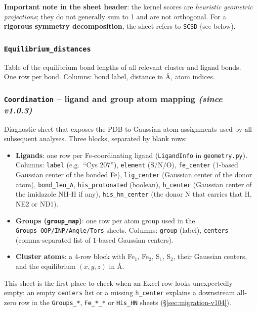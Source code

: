 \documentclass[11pt,a4paper,twoside]{article}
\providecommand{\angstrom}{\text{\AA}}    %
\theoremstyle{remark}
\begin{document}
\textbf{Important note in the sheet header}: the kernel scores
are \emph{heuristic geometric projections}; they do not generally
sum to 1 and are not orthogonal. For a \textbf{rigorous symmetry
decomposition}, the sheet refers to \texttt{SCSD} (see below).

\subsubsection*{\texttt{Equilibrium\_distances}}

Table of the equilibrium bond lengths of all relevant cluster and
ligand bonds. One row per bond. Columns: bond label, distance in
$\angstrom$, atom indices.

\subsubsection*{\texttt{Coordination} -- ligand and group atom mapping
                  \emph{(since v1.0.3)}}
\label{app:wb-main-coordination}

Diagnostic sheet that exposes the PDB-to-Gaussian atom assignments
used by all subsequent analyses. Three blocks, separated by blank
rows:
\begin{itemize}\setlength{\itemsep}{0pt}
  \item \textbf{Ligands}: one row per Fe-coordinating ligand
        (\texttt{LigandInfo} in \texttt{geometry.py}). Columns:
        \texttt{label} (e.g.\ ``Cys 207''), \texttt{element}
        (S/N/O), \texttt{fe\_center} (1-based Gaussian center
        of the bonded Fe), \texttt{lig\_center} (Gaussian
        center of the donor atom), \texttt{bond\_len\_A},
        \texttt{his\_protonated} (boolean), \texttt{h\_center}
        (Gaussian center of the imidazole NH-H if any),
        \texttt{his\_hn\_center} (the donor N that carries
        that H, NE2 or ND1).
  \item \textbf{Groups (\texttt{group\_map})}: one row per atom
        group used in the \texttt{Groups\_OOP/INP/Angle/Tors}
        sheets. Columns: \texttt{group} (label), \texttt{centers}
        (comma-separated list of 1-based Gaussian centers).
  \item \textbf{Cluster atoms}: a 4-row block with Fe$_1$,
        Fe$_2$, S$_1$, S$_2$, their Gaussian centers, and the
        equilibrium $(x, y, z)$ in $\angstrom$.
\end{itemize}

This sheet is the first place to check when an Excel row looks
unexpectedly empty: an empty \texttt{centers} list or a missing
\texttt{h\_center} explains a downstream all-zero row in the
\texttt{Groups\_*}, \texttt{Fe\_*\_*} or \texttt{His\_HN} sheets
(\S\ref{sec:migration-v104}).
\end{document}
